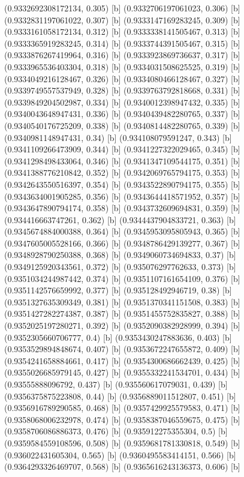 {{{(0.9332692308172134, 0.305) [b] 
(0.9332706197061023, 0.306) [b] 
(0.9332831197061022, 0.307) [b] 
(0.9333147169283245, 0.309) [b] 
(0.9333161058172134, 0.312) [b] 
(0.9333338141505467, 0.313) [b] 
(0.9333365919283245, 0.314) [b] 
(0.9333744391505467, 0.315) [b] 
(0.9333876267419964, 0.316) [b] 
(0.9333923869736637, 0.317) [b] 
(0.9333965536403304, 0.318) [b] 
(0.9334031508625525, 0.319) [b] 
(0.9334049216128467, 0.326) [b] 
(0.9334080466128467, 0.327) [b] 
(0.9339749557537949, 0.328) [b] 
(0.9339763792818668, 0.331) [b] 
(0.9339849204502987, 0.334) [b] 
(0.9340012398947432, 0.335) [b] 
(0.9340043648947431, 0.336) [b] 
(0.9340439482280765, 0.337) [b] 
(0.9340540176725209, 0.338) [b] 
(0.9340814482280765, 0.339) [b] 
(0.9340981148947431, 0.34) [b] 
(0.934108079591247, 0.343) [b] 
(0.9341109266473909, 0.344) [b] 
(0.9341227322029465, 0.345) [b] 
(0.9341298498433064, 0.346) [b] 
(0.9341347109544175, 0.351) [b] 
(0.9341388776210842, 0.352) [b] 
(0.9342069765794175, 0.353) [b] 
(0.9342643550516397, 0.354) [b] 
(0.9343522890794175, 0.355) [b] 
(0.9343634001905285, 0.356) [b] 
(0.9343644418571952, 0.357) [b] 
(0.9343647890794174, 0.358) [b] 
(0.9343732609694831, 0.359) [b] 
(0.934416663747261, 0.362) [b] 
(0.9344437904833721, 0.363) [b] 
(0.9345674884000388, 0.364) [b] 
(0.9345953095805943, 0.365) [b] 
(0.9347605005528166, 0.366) [b] 
(0.9348786429139277, 0.367) [b] 
(0.9348928790250388, 0.368) [b] 
(0.9349060734694833, 0.37) [b] 
(0.9349125920343561, 0.372) [b] 
(0.935076297762633, 0.373) [b] 
(0.9351034244987442, 0.374) [b] 
(0.9351107161654109, 0.376) [b] 
(0.9351142576659992, 0.377) [b] 
(0.935128492946719, 0.38) [b] 
(0.9351327635309349, 0.381) [b] 
(0.9351370341151508, 0.383) [b] 
(0.9351427282274387, 0.387) [b] 
(0.9351455752835827, 0.388) [b] 
(0.9352025197280271, 0.392) [b] 
(0.9352090382928999, 0.394) [b] 
(0.9352305660706777, 0.4) [b] 
(0.9353430247883636, 0.403) [b] 
(0.9353529894848674, 0.407) [b] 
(0.9353672247655872, 0.409) [b] 
(0.9354241658884661, 0.417) [b] 
(0.9354300686662439, 0.425) [b] 
(0.9355026685979145, 0.427) [b] 
(0.9355332241534701, 0.434) [b] 
(0.93555888096792, 0.437) [b] 
(0.935560617079031, 0.439) [b] 
(0.9356375875223808, 0.44) [b] 
(0.9356889011512807, 0.451) [b] 
(0.9356916789290585, 0.468) [b] 
(0.9357429925579583, 0.471) [b] 
(0.9358068006232978, 0.474) [b] 
(0.9358387046559675, 0.475) [b] 
(0.9358706086886373, 0.476) [b] 
(0.935912275355304, 0.5) [b] 
(0.9359584559108596, 0.508) [b] 
(0.9359681781330818, 0.549) [b] 
(0.936022431605304, 0.565) [b] 
(0.9360495583414151, 0.566) [b] 
(0.9364293326469707, 0.568) [b] 
(0.9365616243136373, 0.606) [b] 
}}}
